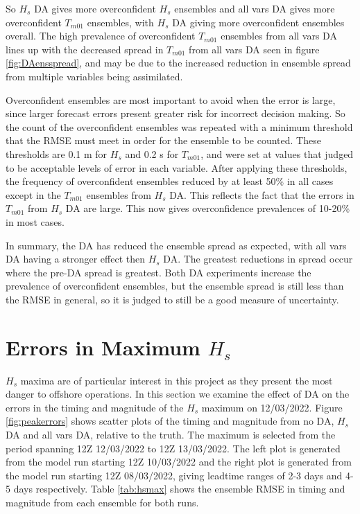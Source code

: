 So $H_s$ DA gives more overconfident $H_s$ ensembles and all vars DA gives more overconfident $T_{m01}$ ensembles, with $H_s$ DA giving more overconfident ensembles overall. The high prevalence of overconfident $T_{m01}$ ensembles from all vars DA lines up with the decreased spread in $T_{m01}$ from all vars DA seen in figure \protect\ref{fig:DAensspread}, and may be due to the increased reduction in ensemble spread from multiple variables being assimilated. %

Overconfident ensembles are most important to avoid when the error is large, since larger forecast errors present greater risk for incorrect decision making. So the count of the overconfident ensembles was repeated with a minimum threshold that the RMSE must meet in order for the ensemble to be counted. These thresholds are 0.1 m for $H_s$ and 0.2 s for $T_{m01}$, and were set at values that judged to be acceptable levels of error in each variable. After applying these thresholds, the frequency of overconfident ensembles reduced by at least 50\% in all cases except in the $T_{m01}$ ensembles from $H_s$ DA. This reflects the fact that the errors in $T_{m01}$ from $H_s$ DA are large. This now gives overconfidence prevalences of 10-20\% in most cases.

In summary, the DA has reduced the ensemble spread as expected, with all vars DA having a stronger effect then $H_s$ DA. The greatest reductions in spread occur where the pre-DA spread is greatest. Both DA experiments increase the prevalence of overconfident ensembles, but the ensemble spread is still less than the RMSE in general, so it is judged to still be a good measure of uncertainty.

\section{Errors in Maximum $H_s$}
\label{sec:hsmax}

$H_s$ maxima are of particular interest in this project as they present the most danger to offshore operations. In this section we examine the effect of DA on the errors in the timing and magnitude of the $H_s$ maximum on 12/03/2022. Figure \ref{fig:peakerrors} shows scatter plots of the timing and magnitude from no DA, $H_s$ DA and all vars DA, relative to the truth. The maximum is selected from the period spanning 12Z 12/03/2022 to 12Z 13/03/2022. The left plot is generated from the model run starting 12Z 10/03/2022 and the right plot is generated from the model run starting 12Z 08/03/2022, giving leadtime ranges of 2-3 days and 4-5 days respectively. Table \ref{tab:hsmax} shows the ensemble RMSE in timing and magnitude from each ensemble for both runs.


